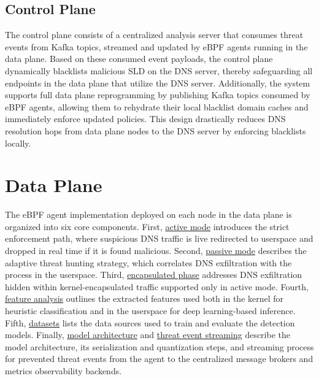 \documentclass [11pt, proquest] {uwthesis}[2020/02/24]
\begin{document}
\subsection{Control Plane}
The control plane consists of a centralized analysis server that consumes threat events from Kafka topics, streamed and updated by eBPF agents running in the data plane. Based on these consumed event payloads, the control plane dynamically blacklists malicious SLD on the DNS server, thereby safeguarding all endpoints in the data plane that utilize the DNS server. Additionally, the system supports full data plane reprogramming by publishing Kafka topics consumed by eBPF agents, allowing them to rehydrate their local blacklist domain caches and immediately enforce updated policies. This design drastically reduces DNS resolution hops from data plane nodes to the DNS server by enforcing blacklists locally.



\section{Data Plane}
The eBPF agent implementation deployed on each node in the data plane is organized into six core components. First, \hyperref[sec:active]{active mode} introduces the strict enforcement path, where suspicious DNS traffic is live redirected to userspace and dropped in real time if it is found malicious. Second, \hyperref[sec:passive]{passive mode} describes the adaptive threat hunting strategy, which correlates DNS exfiltration with the process in the userspace. Third, \hyperref[sec:encap]{encapsulated phase} addresses DNS exfiltration hidden within kernel-encapsulated traffic supported only in active mode. Fourth, \hyperref[sec:features]{feature analysis} outlines the extracted features used both in the kernel for heuristic classification and in the userspace for deep learning-based inference. Fifth, \hyperref[sec:dataset]{datasets} lists the data sources used to train and evaluate the detection models. Finally, \hyperref[sec:model]{model architecture} and \hyperref[sec:threat-event-streaming]{threat event streaming} describe the model architecture, its serialization and quantization steps, and streaming process for prevented threat events from the agent to the centralized message brokers and metrics observability backends.
\end{document}
